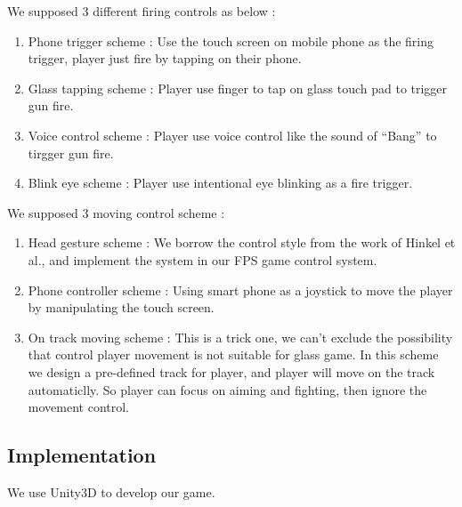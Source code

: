 We supposed 3 different firing controls as below :
\begin{enumerate}
\item Phone trigger scheme : Use the touch screen on mobile phone as the firing trigger, player just fire by tapping on their phone.

\item Glass tapping scheme : Player use finger to tap on glass touch pad to trigger gun fire.

\item Voice control scheme : Player use voice control like the sound of ``Bang'' to tirgger gun fire.

\item Blink eye scheme : Player use intentional eye blinking as a fire trigger.
\end{enumerate}

We supposed 3 moving control scheme :

\begin{enumerate}
\item Head gesture scheme : We borrow the control style from the work of Hinkel et al.\cite{wheel}, and implement the system in our FPS game control system.

\item Phone controller scheme : Using smart phone as a joystick to move the player by manipulating the touch screen.

\item On track moving scheme : This is a trick one, we can't exclude the possibility that control player movement is not suitable for glass game. In this scheme we design a pre-defined track for player, and player will move on the track automaticlly. So player can focus on aiming and fighting, then ignore the movement control.
\end{enumerate}




\subsection{Implementation}
We use Unity3D \cite{unity} to develop our game. 

